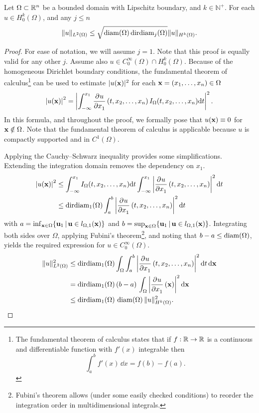 \begin{lemma}
  \label{lem:friederichs_like}
  Let $\Omega \subset \mathbb{R}^n$ be a bounded domain with Lipschitz boundary, and $k \in \mathbb{N}^{+}$. For each $u \in H_0^k(\Omega)$, and any $j \leq n$
  \begin{equation}
    \label{equ:friederichs_like}
    \| u \|_{L^2(\Omega)} \leq \sqrt{\operatorname{diam}(\Omega) \operatorname{dirdiam}_j(\Omega)} \| u \|_{H^k(\Omega)} \text{.}
  \end{equation}
\end{lemma}
\begin{proof}
  For ease of notation, we will assume $j = 1$. Note that this proof is equally valid for any other $j$. Assume also $u \in C^\infty_0(\Omega) \cap H_0^k(\Omega)$. Because of the homogeneous Dirichlet boundary conditions,
  the fundamental theorem of calculus\footnote{The fundamental theorem of calculus states that if $f : \mathbb{R} \to \mathbb{R}$ is a continuous and differentiable function with $f'(x)$ integrable then
    $$
      \int_a^b f'(x) \, \dd x = f(b) - f(a)\text{.}
    $$} can be used to estimate $|u(\vb{x})|^2$ for each $\vb{x} = (x_1, \dots, x_n) \in \Omega$
  $$
    \left|u(\vb{x})\right|^2 = \left|\int_{-\infty}^{x_1} \pdv[]{u}{x_1}\left(t, x_2, \dots, x_{n}\right)I_\Omega(t,x_2, \dots, x_n)\dd t\right|^2 \text{.}
  $$
  In this formula, and throughout the proof, we formally pose that $u(\vb{x}) \equiv 0$ for $\vb{x} \notin \Omega$. Note that the fundamental theorem of calculus is applicable because $u$ is compactly supported and in $C^1(\Omega)$.

  Applying the Cauchy--Schwarz inequality provides some simplifications. Extending the integration domain removes the dependency on $x_1$.
  \begin{align*}
    \left|u(\vb{x})\right|^2 & \leq \int_{-\infty}^{x_1} I_\Omega(t,x_2, \dots, x_n) \dd t \int_{-\infty}^{x_1} \left|\pdv[]{u}{x_1}\left(t,x_2, \dots, x_n\right)\right|^2\dd t \\
                             & \leq \operatorname{dirdiam}_1(\Omega) \int_{a}^{b} \left|\pdv[]{u}{x_1}\left(t, x_2, \dots, x_n\right)\right|^2\dd t
  \end{align*}
  with $a = \inf_{\vb{x} \in \Omega}\{\vb{u}_1 \,|\, \vb{u} \in l_{\Omega, 1}(\vb{x})\}$ and $b = \sup_{\vb{x} \in \Omega}\{\vb{u}_1 \,|\, \vb{u} \in l_{\Omega, 1}(\vb{x})\}$. Integrating both sides over $\Omega$, applying Fubini's theorem\footnote{Fubini's theorem allows (under some easily checked conditions) to reorder the integration order in multidimensional integrals.}, and noting that $b - a \leq \operatorname{diam}(\Omega)$, yields the required expression for $u \in C^\infty_0(\Omega)$.
  \begin{align*}
    \|u\|_{L^2(\Omega)}^2 & \leq \operatorname{dirdiam}_1(\Omega) \int_\Omega \int_{a}^{b} \left|\pdv[]{u}{x_1}\left(t, x_2, \dots, x_{n}\right)\right|^2\dd t \, \dd \vb{x} \\
                          & = \operatorname{dirdiam}_1(\Omega) \, (b - a) \, \int_{\Omega} \left|\pdv[]{u}{x_1}\left(\vb{x}\right)\right|^2 \dd \vb{x}                       \\
                          & \leq \operatorname{dirdiam}_1(\Omega) \, \operatorname{diam}(\Omega) \, \| u \|^2_{H^k(\Omega)}\text{.}
  \end{align*}


\end{proof}
